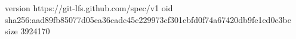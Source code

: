 version https://git-lfs.github.com/spec/v1
oid sha256:aad89fb85077d05ea36cadc45c229973cf301cbfd0f74a67420db9fe1ed0c3be
size 3924170
